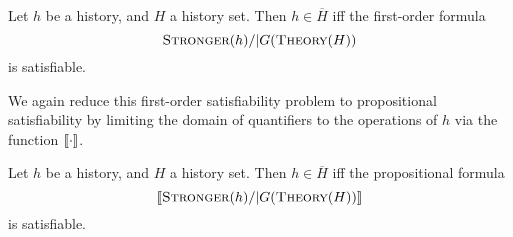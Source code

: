 \begin{theorem}
  \label{th:satisfiability_complete}

  Let $h$ be a history, and $H$ a history set. Then $h \in \overline{H}$ if{f}
  the first-order formula
  $$\textsc{Stronger}(h) /| G(\textsc{Theory}(H))$$
  is satisfiable.

\end{theorem}

We again reduce this first-order satisfiability problem to propositional
satisfiability by limiting the domain of quantifiers to the operations of $h$
via the function $[\![{\cdot}]\!]$.

\begin{corollary}
  \label{cor:satisfiability_pending}

  Let $h$ be a history, and $H$ a history set. Then $h \in \overline{H}$ if{f}
  the propositional formula
  $$[\![{\textsc{Stronger}(h) /| G(\textsc{Theory}(H))}]\!]$$
  is satisfiable.

\end{corollary}
